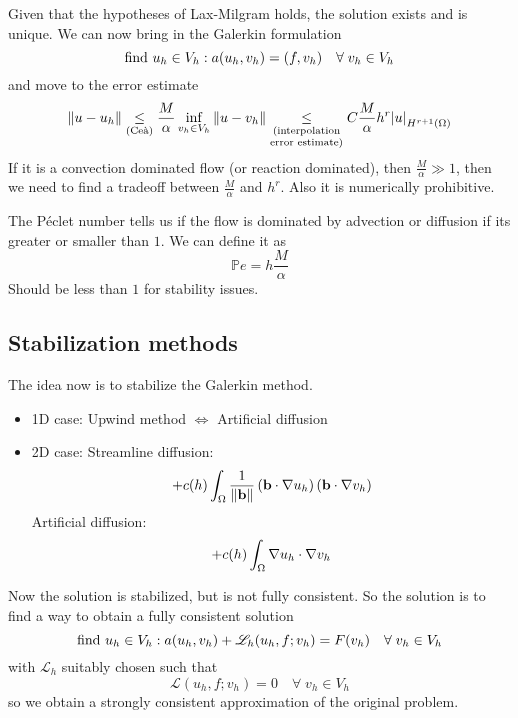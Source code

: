 Given that the hypotheses of Lax-Milgram holds, the solution exists and is unique. We can now bring in the Galerkin formulation
\[
    \text{find }u_h \in V_h : a(u_h, v_h) = (f,v_h) \quad \forall \; v_h \in V_h
\]
and move to the error estimate 
\[
    \norm{u-u_h} \underset{(\text{Ceà})}{\leq} \frac{M}{\alpha} \inf_{v_h \in V_h} \norm{u-v_h} \underset{\substack{(\text{interpolation} \\\text{error estimate})}}{\leq} C \frac{M}{\alpha} h^r \abs{u}_{H^{r+1}(\Omega)}
\]
If it is a convection dominated flow (or reaction dominated), then \(\frac{M}{\alpha} \gg 1\), then we need to find a tradeoff between \(\frac{M}{\alpha}\) and \(h^r\). Also it is numerically prohibitive. 

The Péclet number tells us if the flow is dominated by advection or diffusion if its greater or smaller than \(1\). We can define it as 
\[
    \mathbb{P}e = h\frac{M}{\alpha}
\]
Should be less than \(1\) for stability issues.
\subsection{Stabilization methods}
The idea now is to stabilize the Galerkin method. 
\begin{itemize}
    \item 1D case: Upwind method \(\iff\) Artificial diffusion
    \item 2D case: Streamline diffusion: 
    \[
        +c(h) \int_\Omega \frac{1}{\norm{\textbf{b}}} \left( \textbf{b} \cdot \nabla u_h \right) \left( \textbf{b} \cdot \nabla v_h \right)
    \]
    Artificial diffusion: 
    \[
        +c(h)\int_\Omega \nabla u_h \cdot \nabla v_h 
    \]
\end{itemize}
Now the solution is stabilized, but is not fully consistent. So the solution is to find a way to obtain a fully consistent solution 
\[
    \text{find } u_h \in V_h : a(u_h, v_h) + \mathscr{L}_h (u_h, f; v_h) = F(v_h) \quad \forall \; v_h \in V_h
\]
with \(\mathscr{L}_h\) suitably chosen such that
\[
    \mathscr{L}(u_h, f; v_h) = 0 \quad \forall \; v_h \in V_h
\]
so we obtain a strongly consistent approximation of the original problem.

